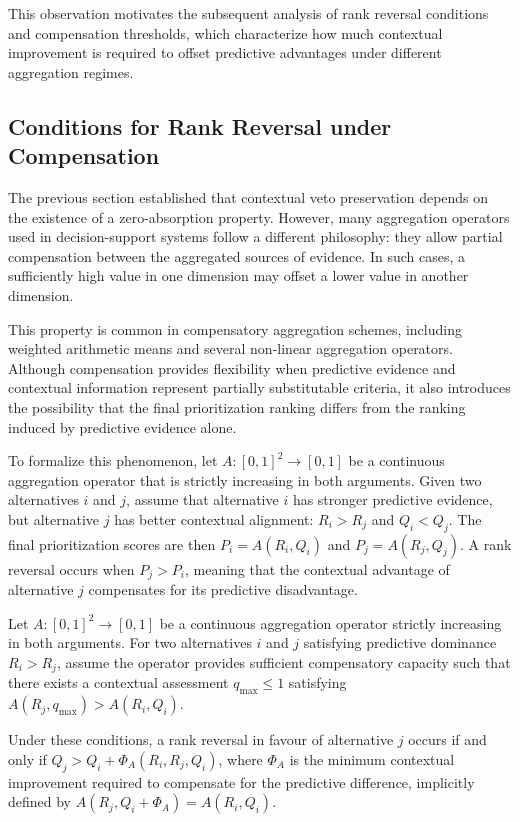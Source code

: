 \documentclass[mathematics,article,submit,moreauthors]{Definitions/mdpi}
\begin{document}
This observation motivates the subsequent analysis of rank reversal
conditions and compensation thresholds, which characterize how much
contextual improvement is required to offset predictive advantages under
different aggregation regimes.



\subsection{Conditions for Rank Reversal under Compensation}
\label{subsec:rank-reversal-compensation}

The previous section established that contextual veto preservation depends on
the existence of a zero-absorption property. However, many aggregation
operators used in decision-support systems follow a different philosophy:
they allow partial compensation between the aggregated sources of evidence.
In such cases, a sufficiently high value in one dimension may offset a
lower value in another dimension.

This property is common in compensatory aggregation schemes, including
weighted arithmetic means and several non-linear aggregation operators.
Although compensation provides flexibility when predictive evidence and
contextual information represent partially substitutable criteria, it also
introduces the possibility that the final prioritization ranking differs
from the ranking induced by predictive evidence alone.

To formalize this phenomenon, let $A:[0,1]^2\rightarrow[0,1]$ be a
continuous aggregation operator that is strictly increasing in both
arguments. Given two alternatives $i$ and $j$, assume that alternative
$i$ has stronger predictive evidence, but alternative $j$ has better
contextual alignment:
$R_i > R_j$ and $Q_i < Q_j$.
The final prioritization scores are then
$P_i=A(R_i,Q_i)$ and $P_j=A(R_j,Q_j)$.
A rank reversal occurs when $P_j>P_i$,
meaning that the contextual advantage of alternative $j$ compensates for
its predictive disadvantage.

\begin{Theorem}
    \label{thm:general-rank-reversal}
    Let $A:[0,1]^2\rightarrow[0,1]$ be a continuous aggregation operator strictly increasing in both arguments. For two alternatives $i$ and $j$ satisfying predictive dominance $R_i>R_j$, assume the operator provides sufficient compensatory capacity such that there exists a contextual assessment $q_{\max} \le 1$ satisfying $A(R_j, q_{\max}) > A(R_i, Q_i)$.
    
    Under these conditions, a rank reversal in favour of alternative $j$ occurs if and only if
    $Q_j > Q_i+\Phi_A(R_i,R_j,Q_i)$,
    where $\Phi_A$ is the minimum contextual improvement required to compensate for the predictive difference, implicitly defined by $A(R_j,Q_i+\Phi_A)=A(R_i,Q_i)$.
\end{Theorem}
    
\end{document}
